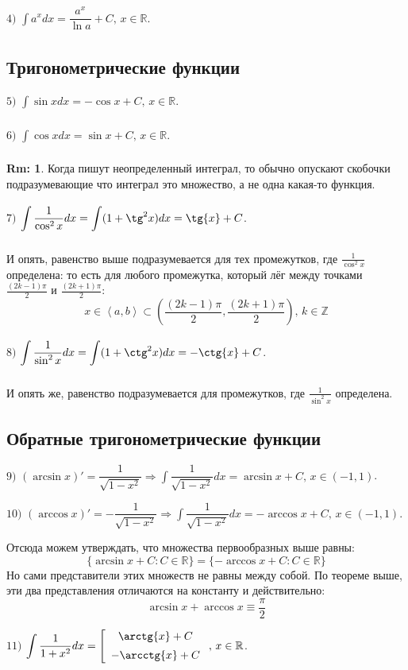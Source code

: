 \documentclass[12pt]{article}
\newcommand{\MR}{\mathbb{R}}
\newcommand{\MZ}{\mathbb{Z}}
\theoremstyle{definition}
\newtheorem{rem}{Rm:}
\newcommand{\ddint}[2]{\displaystyle\int\limits_{#1}^{#2}}
\newcommand{\inner}[2]{\left\langle #1, #2 \right\rangle }
\begin{document}
$4)$ $\ddint{}{}a^xdx = \dfrac{a^x}{\ln{a}} + C, \, x \in \MR$.

\subsection*{Тригонометрические функции}
$5)$ $\ddint{}{}\sin{x}dx = -\cos{x} + C, \, x\in \MR$. 

$6)$ $\ddint{}{}\cos{x}dx = \sin{x} + C, \, x \in \MR$.
\begin{rem}
	Когда пишут неопределенный интеграл, то обычно опускают скобочки подразумевающие что интеграл это множество, а не одна какая-то функция.
\end{rem}

$7)$ $\ddint{}{}\dfrac{1}{\cos^2{x}}dx = \ddint{}{}(1 + \tg^2{x})dx = \tg{x} + C$.

И опять, равенство выше подразумевается для тех промежутков, где $\frac{1}{\cos^2{x}}$ определена: то есть для любого промежутка, который лёг между точками $\frac{(2k-1)\pi}{2}$ и $\frac{(2k +1)\pi}{2}$:
$$
	x \in \inner{a}{b} \subset \left(\dfrac{(2k-1)\pi}{2}, \dfrac{(2k+1)\pi}{2}\right), \, k \in \MZ
$$

$8)$ $\ddint{}{}\dfrac{1}{\sin^2{x}}dx = \ddint{}{}(1 + \ctg^2{x})dx = -\ctg{x} + C$.

И опять же, равенство подразумевается для промежутков, где $\frac{1}{\sin^2{x}}$ определена.

\subsection*{Обратные тригонометрические функции}
$9)$ $(\arcsin{x})' = \dfrac{1}{\sqrt{1 - x^2}} \Rightarrow  \ddint{}{}\dfrac{1}{\sqrt{1 - x^2}}dx = \arcsin{x} + C, \, x \in (-1,1)$.

$10)$ $(\arccos{x})' = -\dfrac{1}{\sqrt{1 - x^2}} \Rightarrow  \ddint{}{}\dfrac{1}{\sqrt{1 - x^2}}dx = -\arccos{x} + C, \, x \in (-1,1)$.

Отсюда можем утверждать, что множества первообразных выше равны:
$$
	\{\arcsin{x} + C \colon C \in \MR\} = \{-\arccos{x} + C \colon C \in \MR\}
$$
Но сами представители этих множеств не равны между собой. По теореме выше, эти два представления отличаются на константу и действительно:
$$
	\arcsin{x} + \arccos{x} \equiv \dfrac{\pi}{2}
$$

$11)$ $\ddint{}{}\dfrac{1}{1 + x^2}dx =  \left[
\begin{array}{c}
	\arctg{x} + C \\[5pt]
	-\arcctg{x} + C
\end{array}
\right., \, x \in \MR$.
\end{document}
